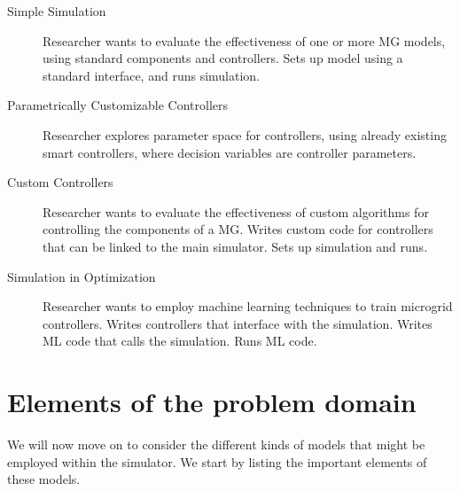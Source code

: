 \documentclass[12pt]{article}
\begin{document}
\begin{description} 

\item[Simple Simulation] Researcher wants to evaluate the effectiveness of one or more MG models, using standard components and controllers. Sets up model using a standard interface, and runs simulation.

\item[Parametrically Customizable Controllers] Researcher explores parameter space for controllers, using already existing smart controllers, where decision variables are controller parameters.

\item[Custom Controllers] Researcher wants to evaluate the effectiveness of custom algorithms for controlling the components of a MG. Writes custom code for controllers that can be linked to the main simulator. Sets up simulation and runs.

\item[Simulation in Optimization] Researcher wants to employ machine learning techniques to train microgrid controllers. Writes controllers that interface with the simulation. Writes ML code that calls the simulation. Runs ML code.

\end{description}

\section{Elements of the problem domain}
We will now move on to consider the different kinds of models that might be employed within the simulator. We start by listing the important elements of these models.
\end{document}
